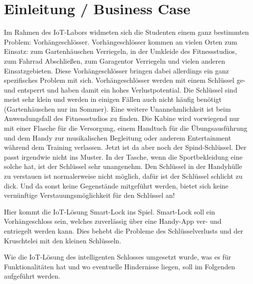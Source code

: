 
\chapter{Einleitung / Business Case}
Im Rahmen des \ac{IoT}-Labors widmeten sich die Studenten einem ganz bestimmten Problem: Vorhängeschlösser. Vorhängeschlösser kommen an vielen Orten zum Einsatz: zum Gartenhäuschen Verriegeln, in der Umkleide des Fitnessstudios, zum Fahrrad Abschließen, zum Garagentor Verriegeln und vielen anderen Einsatzgebieten. Diese Vorhängeschlösser bringen dabei allerdings ein ganz spezifisches Problem mit sich. Vorhängeschlösser werden mit einem Schlüssel ge- und entsperrt und haben damit ein hohes Verlustpotential. Die Schlüssel sind meist sehr klein und werden in einigen Fällen auch nicht häufig benötigt (Gartenhäuschen nur im Sommer).
Eine weitere Unannehmlichkeit ist beim Anwendungsfall des Fitnessstudios zu finden. Die Kabine wird vorwiegend nur mit einer Flasche für die Versorgung, einem Handtuch für die Übungsausführung und dem Handy zur musikalischen Begleitung oder anderem Entertainment während dem Training verlassen. Jetzt ist da aber noch der Spind-Schlüssel. Der passt irgendwie nicht ins Muster. In der Tasche, wenn die Sportbekleidung eine solche hat, ist der Schlüssel sehr unangenehm. Den Schlüssel in der Handyhülle zu verstauen ist normalerweise nicht möglich, dafür ist der Schlüssel schlicht zu dick. Und da sonst keine Gegenstände mitgeführt werden, bietet sich keine vernünftige Verstauungsmöglichkeit für den Schlüssel an! 

Hier kommt die \ac{IoT}-Lösung Smart-Lock ins Spiel. Smart-Lock soll ein Vorhängeschloss sein, welches zuverlässig über eine Handy-App ver- und entriegelt werden kann. Dies behebt die Probleme des Schlüsselverlusts und der \glqq Kruschtelei\grqq{} mit den kleinen Schlüsseln.

Wie die \ac{IoT}-Lösung des intelligenten Schlosses umgesetzt wurde, was es für Funktionalitäten hat und wo eventuelle Hindernisse liegen, soll im Folgenden aufgeführt werden.
